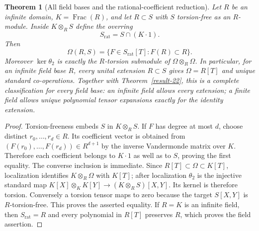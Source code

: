 \documentclass[11pt,a4paper]{article}
\newtheorem{theorem}{Theorem}[section]
\theoremstyle{definition}
\begin{document}
\begin{theorem}[All field bases and the rational-coefficient reduction]\label{result-23}
Let $R$ be an infinite domain, $K=\operatorname{Frac}(R)$, and let
$R\subset S$ with $S$ torsion-free as an $R$-module. Inside
$K\otimes_R S$ define the overring
\[
 S_{\mathrm{rat}}=S\cap(K\cdot1).
\]
Then
\[
 \Omega(R,S)=\{F\in S_{\mathrm{rat}}[T]:F(R)\subset R\}.
\]
Moreover $\ker\theta_2$ is exactly the $R$-torsion submodule of
$\Omega\otimes_R\Omega$. In particular, for an infinite field base
$R$, every unital extension $R\subset S$ gives $\Omega=R[T]$ and
unique standard co-operations. Together with Theorem~\ref{result-22}, this is a
complete classification for every field base: an infinite field
allows every extension; a finite field allows unique polynomial
tensor expansions exactly for the identity extension.
\end{theorem}
\begin{proof}
Torsion-freeness embeds $S$ in $K\otimes_R S$. If $F$ has degree
at most $d$, choose distinct $r_0,\ldots,r_d\in R$. Its coefficient
vector is obtained from $(F(r_0),\ldots,F(r_d))\in R^{d+1}$ by the
inverse Vandermonde matrix over $K$. Therefore each coefficient
belongs to $K\cdot1$ as well as to $S$, proving the first equality.
The converse inclusion is immediate. Since
$R[T]\subset\Omega\subset K[T]$, localization identifies
$K\otimes_R\Omega$ with $K[T]$; after localization $\theta_2$ is the
injective standard map $K[X]\otimes_KK[Y]\to(K\otimes_RS)[X,Y]$.
Its kernel is therefore torsion. Conversely a torsion tensor maps
to zero because the target $S[X,Y]$ is $R$-torsion-free. This proves
the asserted equality. If $R=K$ is an infinite field, then
$S_{\mathrm{rat}}=R$ and every polynomial in $R[T]$ preserves $R$,
which proves the field assertion.
\end{proof}
\end{document}
